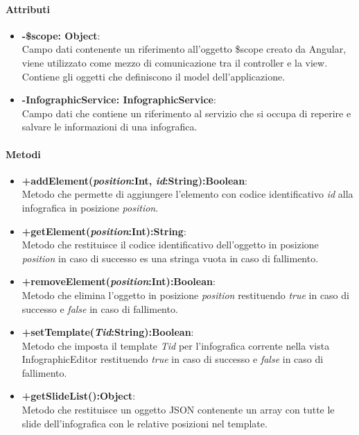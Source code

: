 	\paragraph{Attributi}
	\begin{itemize}
		\item \textbf{-\$scope: Object}:\\
			Campo dati contenente un riferimento all'oggetto \$scope creato da Angular, viene utilizzato come mezzo di comunicazione tra il controller e la view. Contiene gli oggetti che definiscono il model dell'applicazione.
		\item \textbf{-InfographicService: InfographicService}:\\
			Campo dati che contiene un riferimento al servizio che si occupa di reperire e salvare le informazioni di una infografica.
	\end{itemize}

	\paragraph{Metodi}
	\begin{itemize}
	  \item \textbf{+addElement(\textit{position}:Int, \textit{id}:String):Boolean}:\\
		  Metodo che permette di aggiungere l'elemento con codice identificativo \textit{id} alla infografica in posizione \textit{position}.
	  \item \textbf{+getElement(\textit{position}:Int):String}:\\
		  Metodo che restituisce il codice identificativo dell'oggetto in posizione \textit{position} in caso di successo es una stringa vuota in caso di fallimento.
	  \item \textbf{+removeElement(\textit{position}:Int):Boolean}:\\
		  Metodo che elimina l'oggetto in posizione \textit{position} restituendo \textit{true} in caso di successo e \textit{false} in caso di fallimento.
	  \item \textbf{+setTemplate(\textit{Tid}:String):Boolean}:\\
		  Metodo che imposta il template \textit{Tid} per l'infografica corrente nella vista InfographicEditor restituendo \textit{true} in caso di successo e \textit{false} in caso di fallimento.
	  \item \textbf{+getSlideList():Object}:\\
		  Metodo che restituisce un oggetto JSON contenente un array con tutte le slide dell'infografica con le relative posizioni nel template.

	\end{itemize}

